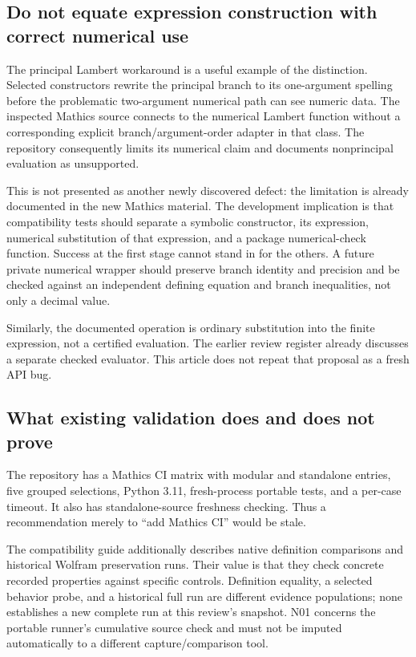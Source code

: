 \documentclass[11pt,a4paper]{article}
\newcommand{\code}[1]{\texttt{\detokenize{#1}}}
\begin{document}
\subsection{Do not equate expression construction with correct numerical use}

The principal Lambert workaround is a useful example of the distinction.
Selected constructors rewrite the principal branch to its one-argument
\code{ProductLog} spelling before the problematic two-argument numerical path
can see numeric data. The inspected Mathics source connects \code{ProductLog}
to the numerical Lambert function without a corresponding explicit
branch/argument-order adapter in that class. The repository consequently
limits its numerical claim and documents nonprincipal evaluation as unsupported.
\cite{mathicscore,mathicsproductlog,mathicsguide}

This is not presented as another newly discovered defect: the limitation is
already documented in the new Mathics material. The development implication is
that compatibility tests should separate a symbolic constructor, its
\code{Normal} expression, numerical substitution of that expression, and a
package numerical-check function. Success at the first stage cannot stand in
for the others. A future private numerical wrapper should preserve branch
identity and precision and be checked against an independent defining equation
and branch inequalities, not only a decimal value.

Similarly, the documented \code{s[value]} operation is ordinary substitution
into the finite expression, not a certified evaluation. The earlier review
register already discusses a separate checked evaluator. This article does not
repeat that proposal as a fresh API bug. \cite{guide,status}

\subsection{What existing validation does and does not prove}

The repository has a Mathics CI matrix with modular and standalone entries,
five grouped selections, Python 3.11, fresh-process portable tests, and a
per-case timeout. It also has standalone-source freshness checking. Thus a
recommendation merely to ``add Mathics CI'' would be stale. \cite{workflow}

The compatibility guide additionally describes native definition comparisons
and historical Wolfram preservation runs. Their value is that they check
concrete recorded properties against specific controls. Definition equality,
a selected behavior probe, and a historical full run are different evidence
populations; none establishes a new complete run at this review's snapshot.
N01 concerns the portable runner's cumulative source check and must not be
imputed automatically to a different capture/comparison tool.
\cite{mathicsguide,runner}
\end{document}
